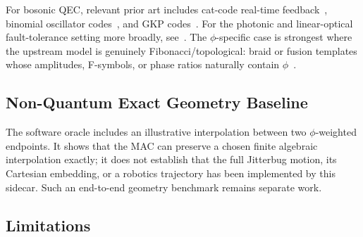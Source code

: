 \documentclass[conference]{IEEEtran}
\begin{document}
For bosonic QEC, relevant prior art includes cat-code real-time feedback~\cite{ofek2016, putterman2024}, binomial oscillator codes~\cite{michael2016}, and GKP codes~\cite{gottesman2001}. For the photonic and linear-optical fault-tolerance setting more broadly, see~\cite{knill2001, kok2007, bartolucci2021, bourassa2021, tzitrin2021}. The $\phi$-specific case is strongest where the upstream model is genuinely Fibonacci/topological: braid or fusion templates whose amplitudes, F-symbols, or phase ratios naturally contain $\phi$~\cite{freedman2002}.

\subsection{Non-Quantum Exact Geometry Baseline}

The software oracle includes an illustrative interpolation between two
$\phi$-weighted endpoints. It shows that the MAC can preserve a chosen finite
algebraic interpolation exactly; it does not establish that the full Jitterbug
motion, its Cartesian embedding, or a robotics trajectory has been implemented
by this sidecar. Such an end-to-end geometry benchmark remains separate work.

\subsection{Limitations}
\end{document}
